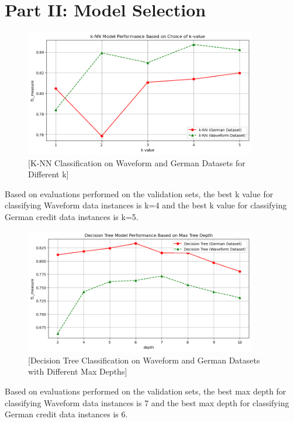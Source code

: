 \documentclass{article}
\begin{document}
    \section*{Part II: Model Selection}
    \begin{figure}[H]
        \centering
        \includegraphics[width=0.9\textwidth, height=0.35\textheight]{./II_2.png}
        \caption{[K-NN Classification on Waveform and German Datasets for Different k]}
    \end{figure}

    Based on evaluations performed on the validation sets, the best k value for
    classifying Waveform data instances is k=4 and the best k value for classifying
    German credit data instances is k=5.

    \begin{figure}[H]
        \centering
        \includegraphics[width=0.9\textwidth, height=0.35\textheight]{./II_3.png}
        \caption{[Decision Tree Classification on Waveform and German Datasets with Different Max Depths]}
    \end{figure}

    Based on evaluations performed on the validation sets, the best max depth for
    classifying Waveform data instances is 7 and the best max depth for classifying
    German credit data instances is 6.
\end{document}
